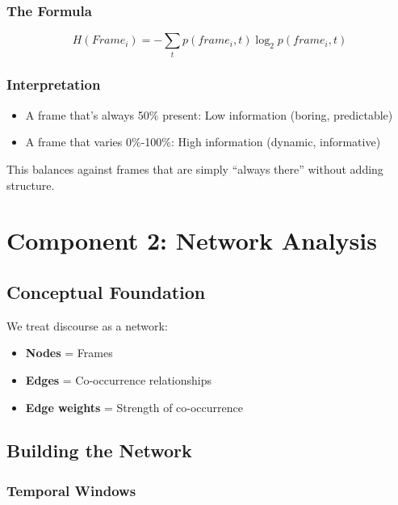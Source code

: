 \documentclass[11pt]{article}
\begin{document}
\subsubsection{The Formula}
\[H(Frame_i) = -\sum_{t} p(frame_i,t) \log_2 p(frame_i,t)\]

\subsubsection{Interpretation}
\begin{itemize}
    \item A frame that's always 50\% present: Low information (boring, predictable)
    \item A frame that varies 0\%-100\%: High information (dynamic, informative)
\end{itemize}

This balances against frames that are simply ``always there'' without adding structure.

\section{Component 2: Network Analysis}

\subsection{Conceptual Foundation}

We treat discourse as a network:
\begin{itemize}
    \item \textbf{Nodes} = Frames
    \item \textbf{Edges} = Co-occurrence relationships
    \item \textbf{Edge weights} = Strength of co-occurrence
\end{itemize}

\subsection{Building the Network}

\subsubsection{Temporal Windows}
\end{document}
